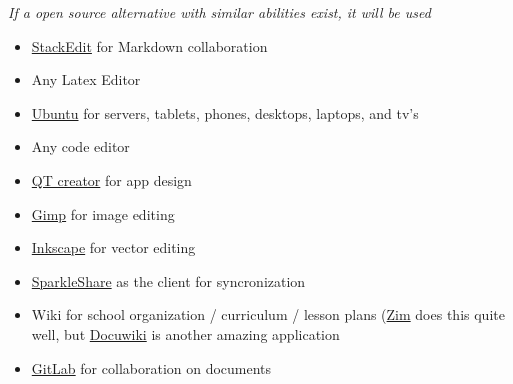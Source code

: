 \documentclass[CSHFoundation.tex]{subfiles}
\begin{document}
\emph{If a open source alternative with similar abilities exist, it will be used}



\begin{itemize}
\item \href{https://stackedit.io/}{StackEdit} for Markdown collaboration
\item Any Latex Editor
\item \href{http://www.ubuntu.com/}{Ubuntu} for servers, tablets, phones, desktops, laptops, and tv's
\item Any code editor
\item \href{http://qt-project.org/}{QT creator} for app design
\item \href{http://www.gimp.org/}{Gimp} for image editing
\item \href{http://www.inkscape.org/en/}{Inkscape} for vector editing
\item \href{./SparkleShare.tex}{SparkleShare} as the client for syncronization
\item Wiki for school organization / curriculum / lesson plans (\href{http://zim-wiki.org/manual/Help/Templates.html}{Zim} does this quite well, but \href{https://www.dokuwiki.org/dokuwiki}{Docuwiki} is another amazing application
\item \href{https://www.gitlab.com/}{GitLab} for collaboration on documents 
\end{itemize}
\end{document}
